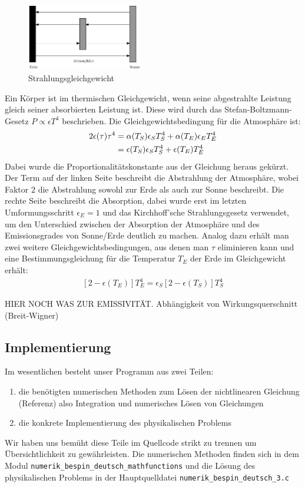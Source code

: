 \documentclass[10pt,a4paper]{article}
\begin{document}
\begin{figure}
\centering
\includegraphics[width=0.45\textwidth]{./figures/strahlungsgleichgewicht.eps}
\caption{Strahlungsgleichgewicht}
\label{fig:strahlungsgleichgewicht}
\end{figure}
Ein Körper ist im thermischen Gleichgewicht, wenn seine abgestrahlte Leistung
gleich seiner absorbierten Leistung ist. Diese wird durch das Stefan-Boltzmann-Gesetz
$P \propto \epsilon T^4$ beschrieben. Die Gleichgewichtsbedingung für die Atmosphäre ist:
\begin{align}
	2\epsilon(\tau)\tau^4 &= \alpha(T_S) \epsilon_S T_S^4 + \alpha(T_E) \epsilon_E T_E^4 \notag \\ &=\epsilon(T_S) \epsilon_S T_S^4 + \epsilon(T_E) T_E^4
\end{align}
Dabei wurde die Proportionalitätskonstante aus der Gleichung heraus gekürzt.
Der Term auf der linken Seite beschreibt die Abstrahlung der Atmosphäre, wobei
Faktor $2$ die Abstrahlung sowohl zur Erde als auch zur Sonne beschreibt.
Die rechte Seite beschreibt die Absorption, dabei wurde erst im letzten
Umformungsschritt $\epsilon_E = 1$ und das Kirchhoff'sche Strahlungsgesetz verwendet,
um den Unterschied zwischen der Absorption der Atmosphäre und des Emissionsgrades von
Sonne/Erde deutlich zu machen.
Analog dazu erhält man zwei weitere Gleichgewichtsbedingungen, aus denen man
$\tau$ eliminieren kann und eine Bestimmungsgleichung für die Temperatur $T_E$
der Erde im Gleichgewicht erhält:
\begin{align}
\left[2-\epsilon(T_E)\right]T_E^4=\epsilon_S\left[2-\epsilon(T_S)\right]T_S^4
\label{eqn:gleichgewicht}
\end{align}

HIER NOCH WAS ZUR EMISSIVITÄT. Abhängigkeit von Wirkungsquerschnitt (Breit-Wigner) 

\subsection{Implementierung}
Im wesentlichen besteht unser Programm aus zwei Teilen:
\begin{enumerate}
	\item die benötigten numerischen Methoden zum Lösen der nichtlinearen Gleichung (Referenz) also Integration und numerisches Lösen von Gleichungen
	\item die konkrete Implementierung des physikalischen Problems
\end{enumerate}
Wir haben uns bemüht diese Teile im Quellcode strikt zu trennen um Übersichtlichkeit zu gewährleisten.
Die numerischen Methoden finden sich in dem Modul \texttt{numerik\_bespin\_deutsch\_mathfunctions} und die Lösung des physikalischen Problems in der Hauptquelldatei \texttt{numerik\_bespin\_deutsch\_3.c}
\end{document}
